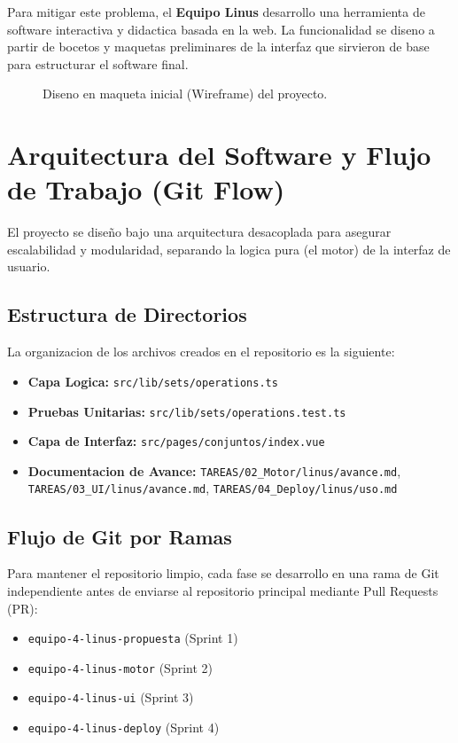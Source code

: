 \documentclass[12pt,a4paper]{article}
\begin{document}
Para mitigar este problema, el \textbf{Equipo Linus} desarrollo una herramienta de software interactiva y didactica basada en la web. La funcionalidad se diseno a partir de bocetos y maquetas preliminares de la interfaz que sirvieron de base para estructurar el software final.

\begin{figure}[H]
    \centering
    \caption{Diseno en maqueta inicial (Wireframe) del proyecto.}
    \label{fig:boceto}
\end{figure}

\section{Arquitectura del Software y Flujo de Trabajo (Git Flow)}
El proyecto se diseño bajo una arquitectura desacoplada para asegurar escalabilidad y modularidad, separando la logica pura (el motor) de la interfaz de usuario. 

\subsection{Estructura de Directorios}
La organizacion de los archivos creados en el repositorio es la siguiente:
\begin{itemize}
    \item \textbf{Capa Logica:} \texttt{src/lib/sets/operations.ts}
    \item \textbf{Pruebas Unitarias:} \texttt{src/lib/sets/operations.test.ts}
    \item \textbf{Capa de Interfaz:} \texttt{src/pages/conjuntos/index.vue}
    \item \textbf{Documentacion de Avance:} \texttt{TAREAS/02\_Motor/linus/avance.md}, \texttt{TAREAS/03\_UI/linus/avance.md}, \texttt{TAREAS/04\_Deploy/linus/uso.md}
\end{itemize}

\subsection{Flujo de Git por Ramas}
Para mantener el repositorio limpio, cada fase se desarrollo en una rama de Git independiente antes de enviarse al repositorio principal mediante Pull Requests (PR):
\begin{itemize}
    \item \texttt{equipo-4-linus-propuesta} (Sprint 1)
    \item \texttt{equipo-4-linus-motor} (Sprint 2)
    \item \texttt{equipo-4-linus-ui} (Sprint 3)
    \item \texttt{equipo-4-linus-deploy} (Sprint 4)
\end{itemize}
\end{document}
